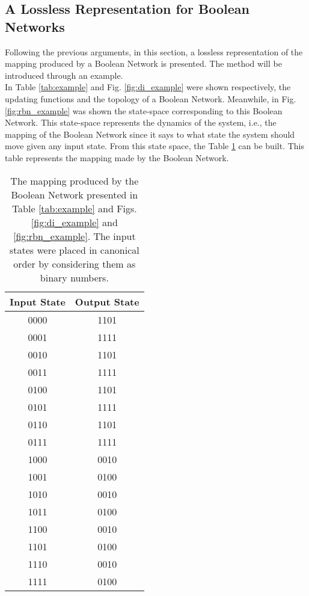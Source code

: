 \subsection{A Lossless Representation for Boolean Networks}
Following the previous arguments, in this section, a lossless representation of the mapping produced by a Boolean Network is presented. The method will be introduced through an example.\\

In Table \ref{tab:example} and Fig. \ref{fig:di_example} were shown respectively, the updating functions and the topology of a Boolean Network. Meanwhile, in Fig. \ref{fig:rbn_example} was shown the state-space corresponding to this Boolean Network. This state-space represents the dynamics of the system, i.e., the mapping of the Boolean Network since it says to what state the system should move given any input state. From this state space, the Table \ref{tab:mapping_ex} can be built. This table represents the mapping made by the Boolean Network.\\

\begin{table}[h]
\centering
\begin{tabular}{ |c|c| } 
 \hline
 Input State & Output State\\ 
 \hline
 \hline
 0000	& 1101\\ 
 \hline
 0001	& 1111\\
 \hline
 0010	& 1101\\
 \hline
 0011	& 1111\\
 \hline
 0100	& 1101\\
 \hline
 0101	& 1111\\
 \hline
 0110	& 1101\\
 \hline
 0111	& 1111\\
 \hline
 1000	& 0010\\
 \hline
 1001	& 0100\\
 \hline
 1010	& 0010\\
 \hline
 1011	& 0100\\
 \hline
 1100	& 0010\\
 \hline
 1101	& 0100\\
 \hline
 1110	& 0010\\
 \hline
 1111	& 0100\\
 \hline
\end{tabular}
 \caption[The mapping produced by a Boolean Network.]{The mapping produced by the Boolean Network presented in Table \ref{tab:example} and Figs. \ref{fig:di_example} and \ref{fig:rbn_example}. The input states were placed in canonical order by considering them as binary numbers.}
 \label{tab:mapping_ex}
\end{table}


